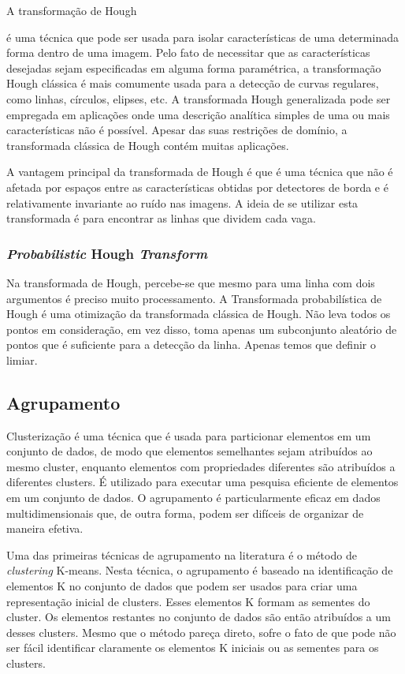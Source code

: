 \documentclass[10pt,twocolumn,letterpaper]{article}
\begin{document}
	A transformação de Hough{\footnotesize \cite{hough} é uma técnica que pode
ser usada para isolar características de uma determinada forma dentro de uma imagem.
Pelo fato de necessitar que as características desejadas sejam especificadas em alguma
forma paramétrica, a transformação Hough clássica é mais comumente usada para a
detecção de curvas regulares, como linhas, círculos, elipses, etc. A transformada Hough
generalizada pode ser empregada em aplicações onde uma descrição analítica simples
de uma ou mais características não é possível. Apesar das suas restrições de domínio,
a transformada clássica de Hough contém muitas aplicações.

	A vantagem principal da transformada de Hough é que é uma técnica que não é afetada
por espaços entre as características obtidas por detectores de borda e é relativamente invariante
ao ruído nas imagens. A ideia de se utilizar esta transformada é para encontrar as linhas que dividem
cada vaga.

\subsubsection{{\em Probabilistic} Hough {\em Transform}}

	Na transformada de Hough, percebe-se que mesmo para uma linha com dois argumentos
é preciso muito processamento. A Transformada probabilística de Hough{\footnotesize \cite{probabilistc-hough}}
é uma otimização da transformada clássica de Hough. Não leva todos os pontos em consideração,
em vez disso, toma apenas um subconjunto aleatório de pontos que é suficiente para a detecção
da linha. Apenas temos que definir o limiar.



\subsection{Agrupamento}

	Clusterização é uma técnica que é usada para particionar elementos em um conjunto
de dados, de modo que elementos semelhantes sejam atribuídos ao mesmo cluster,
enquanto elementos com propriedades diferentes são atribuídos a diferentes clusters.
É utilizado para executar uma pesquisa eficiente de elementos em um conjunto de dados.
O agrupamento é particularmente eficaz em dados multidimensionais que, de outra forma,
podem ser difíceis de organizar de maneira efetiva.

	Uma das primeiras técnicas de agrupamento na literatura é o método de {\em clustering}
K-means. Nesta técnica, o agrupamento é baseado na identificação de elementos K no
conjunto de dados que podem ser usados para criar uma representação inicial de clusters.
Esses elementos K formam as sementes do cluster. Os elementos restantes no conjunto de
dados são então atribuídos a um desses clusters. Mesmo que o método pareça direto, sofre
o fato de que pode não ser fácil identificar claramente os elementos K iniciais ou as sementes
para os clusters.

}
\end{document}
